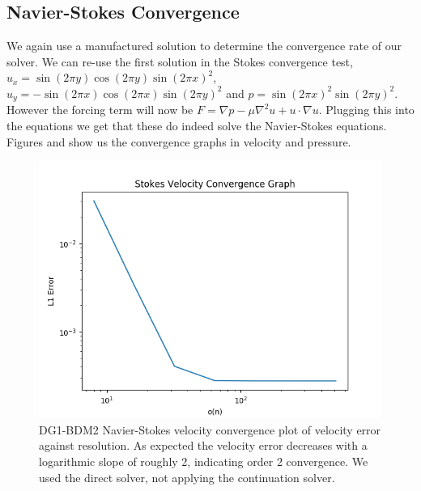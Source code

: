 \documentclass[11pt,twoside,a4paper]{article}
\begin{document}
\subsection{Navier-Stokes Convergence}

We again use a manufactured solution to determine the convergence rate of our solver.
We can re-use the first solution in the Stokes convergence test, $u_x = \sin(2 \pi y) \cos(2 \pi y)\sin(2 \pi x)^2$, $u_y= -\sin(2 \pi x) \cos(2 \pi x) \sin(2 \pi y)^2$ and $p = \sin(2 \pi x)^2 \sin(2 \pi y)^2$.\\
However the forcing term will now be $F = \nabla p - \mu \nabla^2 u + u \cdot \nabla u$.
Plugging this into the equations we get that these do indeed solve the Navier-Stokes equations.\\
Figures and show us the convergence graphs in velocity and pressure.\\

\begin{figure}
  \includegraphics[width=\linewidth]{navier_stokes_convergence_dbc0.png}
  \caption{DG1-BDM2 Navier-Stokes velocity convergence plot of velocity error against resolution. As expected the velocity error decreases with a logarithmic slope of roughly 2, indicating order 2 convergence. We used the direct solver, not applying the continuation solver.}
\end{figure}
\end{document}
